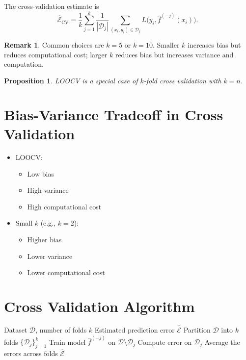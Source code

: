 \documentclass[12pt,oneside]{book}
\numberwithin{equation}{section}
\theoremstyle{definition}
\newtheorem{remark}{Remark}[section]
\theoremstyle{plain}
\newtheorem{proposition}{Proposition}[section]
\theoremstyle{remark}
\begin{document}
The cross-validation estimate is
\[
\widehat{\mathcal{E}}_{\mathrm{CV}}
=
\frac{1}{k}
\sum_{j=1}^k
\frac{1}{|\mathcal{D}_j|}
\sum_{(x_i,y_i)\in \mathcal{D}_j}
L\big(y_i,\hat{f}^{(-j)}(x_i)\big).
\]

\begin{remark}
Common choices are $k=5$ or $k=10$. Smaller $k$ increases bias but reduces computational cost; larger $k$ reduces bias but increases variance and computation.
\end{remark}

\begin{proposition}
LOOCV is a special case of $k$-fold cross validation with $k=n$.
\end{proposition}

\section{Bias-Variance Tradeoff in Cross Validation}

\begin{itemize}
    \item LOOCV:
    \begin{itemize}
        \item Low bias
        \item High variance
        \item High computational cost
    \end{itemize}
    \item Small $k$ (e.g., $k=2$):
    \begin{itemize}
        \item Higher bias
        \item Lower variance
        \item Lower computational cost
    \end{itemize}
\end{itemize}

\section{Cross Validation Algorithm}

\begin{algorithm}[H]
\caption{$k$-Fold Cross Validation}
\begin{algorithmic}[1]
\Require Dataset $\mathcal{D}$, number of folds $k$
\Ensure Estimated prediction error $\widehat{\mathcal{E}}$
\State Partition $\mathcal{D}$ into $k$ folds $\{\mathcal{D}_j\}_{j=1}^k$
    \State Train model $\hat{f}^{(-j)}$ on $\mathcal{D} \setminus \mathcal{D}_j$
    \State Compute error on $\mathcal{D}_j$
\EndFor
\State Average the errors across folds
\State \Return $\widehat{\mathcal{E}}$
\end{algorithmic}
\end{algorithm}
\end{document}
